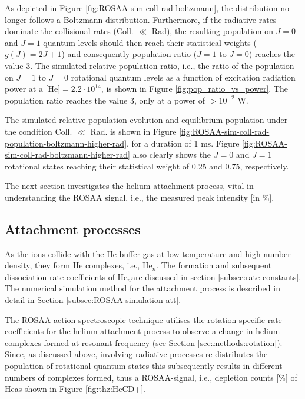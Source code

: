 As depicted in Figure \ref{fig:ROSAA-sim-coll-rad-boltzmann}, the distribution
no longer follows a Boltzmann distribution. Furthermore, if the radiative rates
dominate the collisional rates (Coll. $\ll$ Rad), the resulting population on $J=0$ and $J=1$ 
quantum levels should then reach their statistical weights ($g(J) = 2J + 1$) and 
consequently population ratio ($J=1$ to $J=0$) reaches the value 3. 
The simulated relative population ratio, i.e., the ratio of the population on $J=1$ to $J=0$ 
rotational quantum levels as a function of excitation radiation power at a [He]$=2.2\cdot10^{14}$\percc, 
is shown in Figure \ref{fig:pop_ratio_vs_power}. The population ratio reaches the value 3, only at a power of $> 10^{-2}$ W.



The simulated relative population evolution and equilibrium population under the 
condition Coll. $\ll$ Rad. is shown in Figure 
\ref{fig:ROSAA-sim-coll-rad-population-boltzmann-higher-rad}, for a duration of 1 ms. Figure
\ref{fig:ROSAA-sim-coll-rad-boltzmann-higher-rad} also clearly shows the $J=0$
and $J=1$ rotational states reaching their statistical weight of 0.25 and 0.75,
respectively.

The next section investigates the helium attachment process, vital in
understanding the ROSAA signal, i.e., the measured peak intensity [in $\%$].

\subsection{Attachment processes}
\label{subsec:CD+-kinetics-simulation-coll-rad-att}

As the \CD ions collide with the He buffer gas at low temperature and high
number density, they form He complexes, i.e., He$_n$\CD. The formation and
subsequent dissociation rate coefficients of He$_n$\CD are discussed in section
\ref{subsec:rate-constants}. The numerical simulation method for the attachment
process is described in detail in Section \ref{subsec:ROSAA-simulation-att}.

The ROSAA action spectroscopic technique utilises the rotation-specific
rate coefficients for the helium attachment process to observe a change in
helium-complexes formed at resonant frequency (see Section
\ref{sec:methods:rotation}). Since, as discussed above, involving radiative
processes re-distributes the population of rotational quantum states this
subsequently results in different numbers of complexes formed, thus a
ROSAA-signal, i.e., depletion counts [\%] of He\CD as shown in Figure
\ref{fig:thz:HeCD+}.

